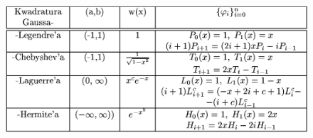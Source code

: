   \begin{frame}
  	\begin{figure}[h]
			\includegraphics[width=.95\linewidth]{img/6/6_03}
		\end{figure}
  \end{frame}


























